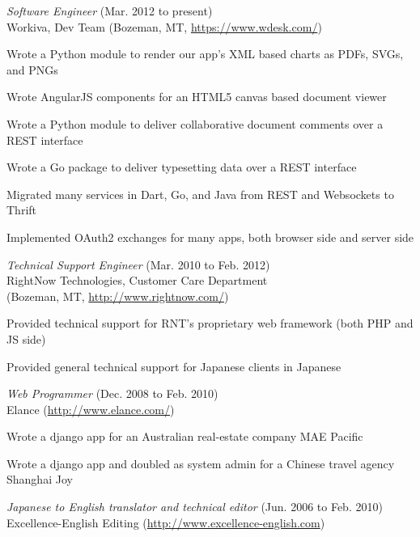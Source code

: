 \documentclass[10pt, a4paper]{article}
\begin{document}
\begin{itemize*}
  \item \emph{Software Engineer} (Mar. 2012 to present)\\
    Workiva, Dev Team (Bozeman, MT, \url{https://www.wdesk.com/})
    \begin{itemize*}
      \item Wrote a Python module to render our app's XML based charts as PDFs, SVGs, and PNGs
      \item Wrote AngularJS components for an HTML5 canvas based document viewer
      \item Wrote a Python module to deliver collaborative document comments over a REST interface
      \item Wrote a Go package to deliver typesetting data over a REST interface
      \item Migrated many services in Dart, Go, and Java from REST and Websockets to Thrift
      \item Implemented OAuth2 exchanges for many apps, both browser side and server side
    \end{itemize*}
  \item \emph{Technical Support Engineer} (Mar. 2010 to Feb. 2012)\\
    RightNow Technologies, Customer Care Department\\
    (Bozeman, MT, \url{http://www.rightnow.com/})
    \begin{itemize*}
      \item Provided technical support for RNT's proprietary web framework (both PHP and JS side)
      \item Provided general technical support for Japanese clients in Japanese
    \end{itemize*}
  \item \emph{Web Programmer} (Dec. 2008 to Feb. 2010)\\
    Elance (\url{http://www.elance.com/})
    \begin{itemize*}
      \item Wrote a django app for an Australian real-estate company MAE Pacific
      \item Wrote a django app and doubled as system admin for a Chinese travel agency Shanghai Joy
    \end{itemize*}
  \item \emph{Japanese to English translator and technical editor} (Jun. 2006 to Feb. 2010)\\
    Excellence-English Editing (\url{http://www.excellence-english.com})
\end{itemize*}
\end{document}
